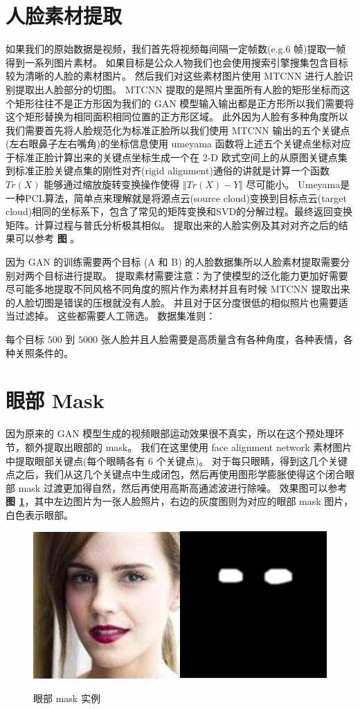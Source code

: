 \section{人脸素材提取}
如果我们的原始数据是视频，我们首先将视频每间隔一定帧数(e.g.$6$ 帧)提取一帧得到一系列图片素材。
如果目标是公众人物我们也会使用搜索引擎搜集包含目标较为清晰的人脸的素材图片。
然后我们对这些素材图片使用 MTCNN 进行人脸识别提取出人脸部分的切图。
MTCNN 提取的是照片里面所有人脸的矩形坐标而这个矩形往往不是正方形因为我们的 GAN 模型输入输出都是正方形所以我们需要将这个矩形替换为相同面积相同位置的正方形区域。
此外因为人脸有多种角度所以我们需要首先将人脸规范化为标准正脸所以我们使用 MTCNN 输出的五个关键点(左右眼鼻子左右嘴角)的坐标信息使用 umeyama 函数将上述五个关键点坐标对应于标准正脸计算出来的关键点坐标生成一个在 2-D 欧式空间上的从原图关键点集到标准正脸关键点集的刚性对齐(rigid alignment)通俗的讲就是计算一个函数 $Tr(X)$ 能够通过缩放旋转变换操作使得 $\Vert Tr(X) - Y \Vert$ 尽可能小。
Umeyama是一种PCL算法，简单点来理解就是将源点云(source cloud)变换到目标点云(target cloud)相同的坐标系下，包含了常见的矩阵变换和SVD的分解过程。最终返回变换矩阵。计算过程与普氏分析极其相似。
提取出来的人脸实例及其对对齐之后的结果可以参考 \textbf{图 }。


因为 GAN 的训练需要两个目标 (A 和 B) 的人脸数据集所以人脸素材提取需要分别对两个目标进行提取。
提取素材需要注意：为了使模型的泛化能力更加好需要尽可能多地提取不同风格不同角度的照片作为素材并且有时候 MTCNN 提取出来的人脸切图是错误的压根就没有人脸。
并且对于区分度很低的相似照片也需要适当过滤掉。
这些都需要人工筛选。
数据集准则：


每个目标 $500$ 到 $5000$ 张人脸并且人脸需要是高质量含有各种角度，各种表情，各种关照条件的。


\section{眼部 Mask}
因为原来的 GAN 模型生成的视频眼部运动效果很不真实，所以在这个预处理环节，额外提取出眼部的 mask。
我们在这里使用 face alignment network 素材图片中提取眼部关键点(每个眼睛各有 $6$ 个关键点)。
对于每只眼睛，得到这几个关键点之后，我们从这几个关键点中生成闭包，然后再使用图形学膨胀使得这个闭合眼部 mask 过渡更加得自然，然后再使用高斯高通滤波进行除噪。
效果图可以参考 \textbf{图 \ref{fig:eyes_mask}}，其中左边图片为一张人脸照片，右边的灰度图则为对应的眼部 mask 图片，白色表示眼部。

\begin{figure}[h!]
	\caption{眼部 mask 实例}
	\centering
	\includegraphics[width=\textwidth]{figure/resources/eyes_mask.png}
	\label{fig:eyes_mask}
\end{figure}

